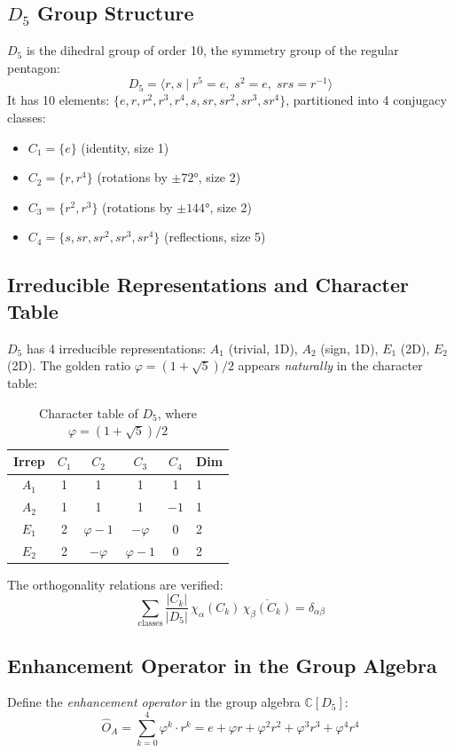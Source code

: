 \documentclass[12pt,a4paper,twocolumn]{article}
\renewcommand{\phi}{\varphi}
\begin{document}
\subsection{$D_5$ Group Structure}
$D_5$ is the dihedral group of order 10, the symmetry group of the regular pentagon:
\[
D_5 = \langle r, s \mid r^5 = e,\; s^2 = e,\; srs = r^{-1} \rangle
\]
It has 10 elements: $\{e, r, r^2, r^3, r^4, s, sr, sr^2, sr^3, sr^4\}$, partitioned into 4 conjugacy classes:
\begin{itemize}
\item $C_1 = \{e\}$ (identity, size 1)
\item $C_2 = \{r, r^4\}$ (rotations by $\pm 72°$, size 2)
\item $C_3 = \{r^2, r^3\}$ (rotations by $\pm 144°$, size 2)
\item $C_4 = \{s, sr, sr^2, sr^3, sr^4\}$ (reflections, size 5)
\end{itemize}

\subsection{Irreducible Representations and Character Table}
$D_5$ has 4 irreducible representations: $A_1$ (trivial, 1D), $A_2$ (sign, 1D), $E_1$ (2D), $E_2$ (2D). The golden ratio $\phi = (1+\sqrt{5})/2$ appears \emph{naturally} in the character table:

\begin{table}[H]
\centering
\caption{Character table of $D_5$, where $\phi = (1+\sqrt{5})/2$}
\label{tab:d5_character}
\begin{tabular}{c|cccc|l}
\hline
Irrep & $C_1$ & $C_2$ & $C_3$ & $C_4$ & Dim \\
\hline
$A_1$ & 1 & 1 & 1 & 1 & 1 \\
$A_2$ & 1 & 1 & 1 & $-1$ & 1 \\
$E_1$ & 2 & $\phi - 1$ & $-\phi$ & 0 & 2 \\
$E_2$ & 2 & $-\phi$ & $\phi - 1$ & 0 & 2 \\
\hline
\end{tabular}
\end{table}

The orthogonality relations are verified:
\[
\sum_{\text{classes}} \frac{|C_k|}{|D_5|} \, \chi_\alpha(C_k) \, \overline{\chi_\beta(C_k)} = \delta_{\alpha\beta}
\]

\subsection{Enhancement Operator in the Group Algebra}
Define the \emph{enhancement operator} in the group algebra $\mathbb{C}[D_5]$:
\[
\hat{O}_A = \sum_{k=0}^{4} \phi^k \cdot r^k = e + \phi r + \phi^2 r^2 + \phi^3 r^3 + \phi^4 r^4
\]
\end{document}
